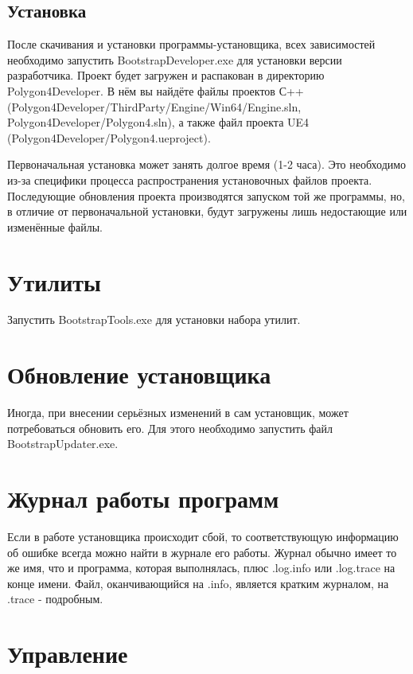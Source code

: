 \documentclass[a4paper,12pt]{report}
\newcommand{\ue}{UE4\xspace}
\begin{document}
\subsection{Установка}

После скачивания и установки программы-установщика, всех зависимостей необходимо запустить BootstrapDeveloper.exe для установки версии разработчика.
Проект будет загружен и распакован в директорию \\Polygon4Developer.
В нём вы найдёте файлы проектов С++ \\(Polygon4Developer/ThirdParty/Engine/Win64/Engine.sln,\\ Polygon4Developer/Polygon4.sln), а также файл проекта \ue\\ (Polygon4Developer/Polygon4.ueproject).

Первоначальная установка может занять долгое время (1-2 часа).
Это необходимо из-за специфики процесса распространения установочных файлов проекта.
Последующие обновления проекта производятся запуском той же программы, но, в отличие от первоначальной установки, будут загружены лишь недостающие или изменённые файлы.


\section{Утилиты}

Запустить BootstrapTools.exe для установки набора утилит.


\section{Обновление установщика}

Иногда, при внесении серьёзных изменений в сам установщик, может потребоваться обновить его.
Для этого необходимо запустить файл BootstrapUpdater.exe.

\section{Журнал работы программ}

Если в работе установщика происходит сбой, то соответствующую информацию об ошибке всегда можно найти в журнале его работы.
Журнал обычно имеет то же имя, что и программа, которая выполнялась, плюс .log.info или .log.trace на конце имени.
Файл, оканчивающийся на .info, является кратким журналом, на .trace - подробным.

\section{Управление}
\end{document}

